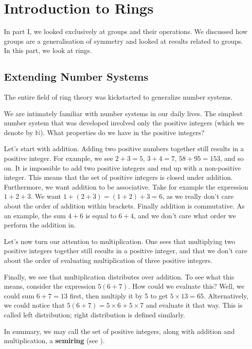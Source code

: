 \chapter{Introduction to Rings}
In part I, we looked exclusively at groups and their operations. We discussed how groups are a generalisation of symmetry and looked at results related to groups. In this part, we look at rings.

\section{Extending Number Systems}
The entire field of ring theory was kickstarted to generalize number systems.

We are intimately familiar with number systems in our daily lives. The simplest number system that was developed involved only the positive integers (which we denote by $\mathbb{N}$). What properties do we have in the positive integers?

Let's start with addition. Adding two positive numbers together still results in a positive integer. For example, we see $2 + 3 = 5$, $3 + 4 = 7$, $58 + 95 = 153$, and so on. It is impossible to add two positive integers and end up with a non-positive integer. This means that the set of positive integers is closed under addition. Furthermore, we want addition to be associative. Take for example the expression $1 + 2 + 3$. We want $1 + (2 + 3) = (1 + 2) + 3 = 6$, as we really don't care about the order of addition within brackets. Finally addition is commutative. As an example, the sum $4 + 6$ is equal to $6 + 4$, and we don't care what order we perform the addition in.

Let's now turn our attention to multiplication. One sees that multiplying two positive integers together still results in a positive integer, and that we don't care about the order of evaluating multiplication of three positive integers.

Finally, we see that multiplication distributes over addition. To see what this means, consider the expression $5(6+7)$. How could we evaluate this? Well, we could sum $6+7 = 13$ first, then multiply it by 5 to get $5\times13 = 65$. Alternatively, we could notice that $5(6+7) = 5 \times 6 + 5 \times 7$ and evaluate it that way. This is called left distribution; right distribution is defined similarly.

In summary, we may call the set of positive integers, along with addition and multiplication, a \textbf{semiring} (see \cite{mathworld_semiring-definition}).

